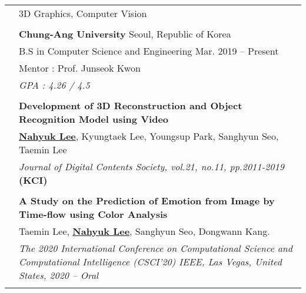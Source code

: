 \documentclass[letterpaper, 11pt]{article}
\begin{document}
\begin{longtable}{p{1.3in}p{4.8in}}


\nohyphens{\color{OliveGreen}{Research interests}}
& 3D Graphics, Computer Vision \\
& \\


\color{OliveGreen}{Education} 
& \textbf{Chung-Ang University} \hfill Seoul, Republic of Korea \\ 
& B.S in Computer Science and Engineering \hfill Mar. 2019 -- Present \\
& Mentor : Prof. Junseok Kwon  \\
& {\it GPA : 4.26 / 4.5}\\
& \\




\nohyphens{\color{OliveGreen}{Publications}} 

& \textbf{Development of 3D Reconstruction and Object Recognition Model using Video} \\
& \uline{\textbf{Nahyuk Lee}}, Kyungtaek Lee, Youngsup Park, Sanghyun Seo, Taemin Lee  \\
& \textit{Journal of Digital Contents Society, vol.21, no.11, pp.2011-2019} \textbf{(KCI)}\\
& \\


& \textbf{A Study on the Prediction of Emotion from Image by Time-flow using Color Analysis} \\
& Taemin Lee, \uline{\textbf{Nahyuk Lee}}, Sanghyun Seo, Dongwann Kang. \\
& \textit{The 2020 International Conference on Computational Science and Computational Intelligence (CSCI'20) IEEE, Las Vegas, United States, 2020 -- Oral}\\
& \\



\end{longtable}
\end{document}
